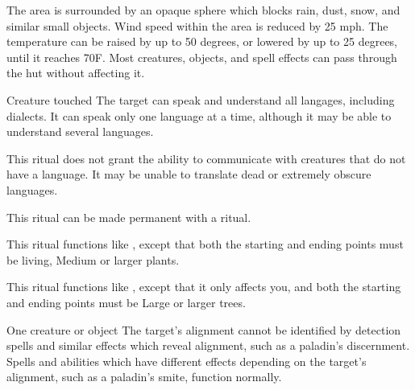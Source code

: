 \spelldur{\durext \dismissable}
\spellline
\spelleffect The area is surrounded by an opaque sphere which blocks rain, dust, snow, and similar small objects. Wind speed within the area is reduced by 25 mph. The temperature can be raised by up to 50 degrees, or lowered by up to 25 degrees, until it reaches 70\degree F.
\spellnotes Most creatures, objects, and spell effects can pass through the hut without affecting it.

\spelldur{\durlong}
\begin{spelltarget}{Creature touched}
    \spelleffect The target can speak and understand all langages, including dialects. It can speak only one language at a time, although it may be able to understand several languages.
\end{spelltarget}
\spellnotes This ritual does not grant the ability to communicate with creatures that do not have a language. It may be unable to translate dead or extremely obscure languages. 

This ritual can be made permanent with a  ritual.

\spellline
\spelleffect This ritual functions like , except that both the starting and ending points must be living, Medium or larger plants.

\spellspecial This ritual functions like , except that it only affects you, and both the starting and ending points must be Large or larger trees.

\spellrng{\rngclose}
\spelldur{\durext \dismissable}
\begin{spelltarget}{One creature or object}
    \spelleffect The target's alignment cannot be identified by detection spells and similar effects which reveal alignment, such as a paladin's discernment. Spells and abilities which have different effects depending on the target's alignment, such as a paladin's smite, function normally.
\end{spelltarget}


